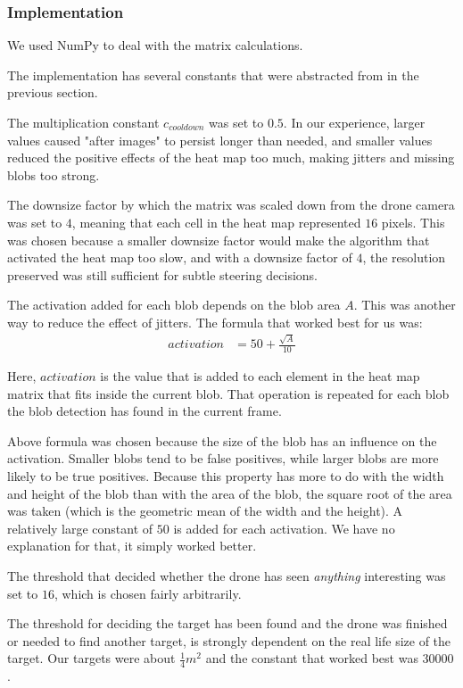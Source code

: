\documentclass[a4paper,10pt]{article}
\begin{document}
\subsubsection{Implementation}
We used NumPy to deal with the matrix calculations.

The implementation has several constants that were abstracted from in the
previous section.

The multiplication constant $c_{{cooldown}}$ was set to
$0.5$. In our experience, larger values caused "after images" to persist
longer than needed, and smaller values reduced the positive effects of
the heat map too much, making jitters and missing blobs too strong.

The downsize factor by which the matrix was scaled down from the
drone camera was set to $4$, meaning that each cell in the heat map represented $16$
pixels. This was chosen because a smaller downsize factor would make the
algorithm that activated the heat map too slow, and with a downsize factor of
$4$, the resolution preserved was still sufficient for subtle steering
decisions.

The activation added for each blob depends on the blob area $A$. This was
another way to reduce the effect of jitters. The formula
that worked best for us was:
\begin{align*}
 activation &=50 + \frac{\sqrt{A}}{10}
\end{align*}

Here, $activation$ is the value that is added to each element in the
heat map matrix that fits inside the current blob. That operation is
repeated for each blob the blob detection has found in the current frame.

Above formula was chosen because the size of the blob has an influence on the
activation. Smaller blobs tend to be false positives, while larger
blobs are more likely to be true positives. Because this property has
more to do with the width and height of the blob than with the area
of the blob, the square root of the area was taken (which is the
geometric mean of the width and the height). A relatively large
constant of $50$ is added for each activation. We have no explanation for
that, it simply worked better.

The threshold that decided whether the drone has seen \emph{anything}
interesting was set to $16$, which is chosen fairly arbitrarily.

The threshold for deciding the target has been found and the drone was
finished or needed to find another target, is strongly dependent on the
real life size of the target. Our targets were about $\frac{1}{4} m^2$
and the constant that worked best was $30 000$.
\end{document}
